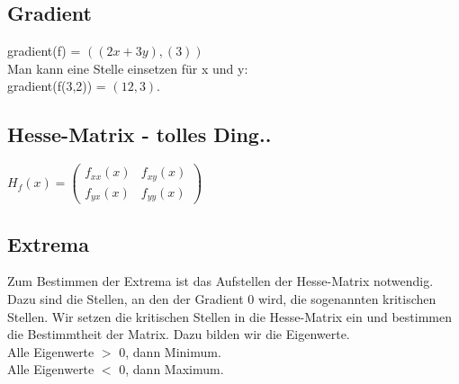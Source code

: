 \documentclass[a4paper,landscape, 11pt]{article}
\begin{document}
\begin{multicols}{4}
\begin{small}
       \subsection{Gradient}
       gradient(f) = $((2x + 3y), (3))$ \\
       Man kann eine Stelle einsetzen für x und y:\\
       gradient(f(3,2)) = $(12, 3)$.
       
       \subsection{Hesse-Matrix - tolles Ding..}
       $H_f(x) = \left( 
       \begin{matrix}
       f_{xx}(x) & f_{xy}(x) \\
       f_{yx}(x) & f_{yy}(x)
       \end{matrix}
       \right)
       $
       
       \subsection{Extrema}
       Zum Bestimmen der Extrema ist das Aufstellen der Hesse-Matrix notwendig.
       Dazu sind die Stellen, an den der Gradient 0 wird, die sogenannten kritischen Stellen. Wir setzen die kritischen Stellen in die Hesse-Matrix ein und bestimmen die Bestimmtheit der Matrix. Dazu bilden wir die Eigenwerte. \\
       Alle Eigenwerte $>$ 0, dann Minimum.\\
       Alle Eigenwerte $<$ 0, dann Maximum.

\end{small}
\end{multicols}
\end{document}

